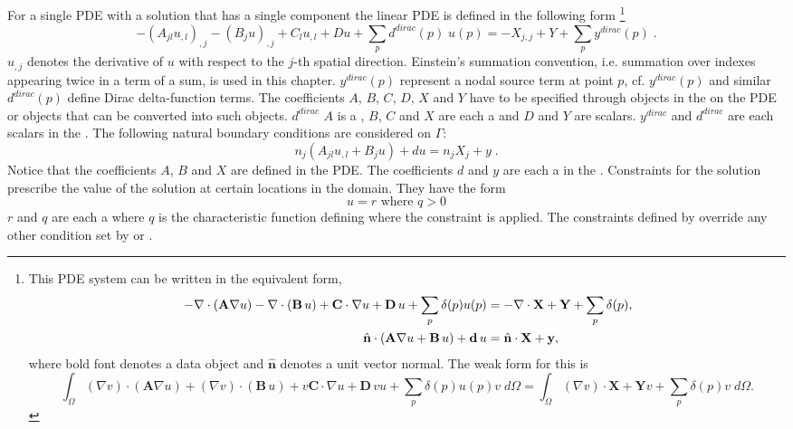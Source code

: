 For a single PDE with a solution that has a single component the linear PDE is
defined in the following form \footnote{This PDE system can be written in the equivalent form, \begin{align*} \centering \, -\nabla \cdot \left( \textbf{A} \nabla u \right) - \nabla \cdot \left( \textbf{B} \, u \right) + \textbf{C} \cdot \nabla u + \textbf{D} \, u + \sum_p \delta(p) u(p) &= - \nabla \cdot \textbf{X} + \textbf{Y} + \sum_p \delta(p), \\
	\hat{\textbf{n}} \cdot \left( \textbf{A} \nabla u + \textbf{B} \, u \right) + \textbf{d} \, u &= \hat{\textbf{n}} \cdot \textbf{X} + \textbf{y}, 
\end{align*} where bold font denotes a data object and $\hat{\textbf{n}}$ denotes a unit vector normal.  The weak form for this is
\begin{equation*}\int_{\Omega} (\nabla v)\cdot \left( \textbf{A} \nabla u \right) +( \nabla v) \cdot \left( \textbf{B} \, u \right) + v\textbf{C} \cdot \nabla u + \textbf{D} \,v u + \sum_p \delta(p) u(p)v \;d\Omega = \int_{\Omega}(\nabla v) \cdot \textbf{X} + \textbf{Y}v + \sum_p \delta(p)v\; d\Omega.
\end{equation*}
}
\begin{equation}\label{LINEARPDE.SINGLE.1}
-(A_{jl} u_{,l})_{,j}-(B_{j} u)_{,j}+C_{l} u_{,l}+D u + \sum_p d^{dirac}(p) \; u(p) =-X_{j,j}+Y + \sum_p y^{dirac}(p)  \; .
\end{equation}
$u_{,j}$ denotes the derivative of $u$ with respect to the $j$-th spatial direction.
Einstein's summation convention, i.e. summation over indexes appearing twice
in a term of a sum, is used in this chapter. $y^{dirac}(p)$ represent a nodal source term 
at point $p$, cf. $y^{dirac}(p) $ and similar $d^{dirac}(p)$ define Dirac delta-function 
terms. 
The coefficients $A$, $B$, $C$, $D$, $X$ and $Y$ have to be specified through
\Data objects in the \Function on the PDE or objects that can be converted
into such \Data objects. $d^{dirac}$
$A$ is a \RankTwo, $B$, $C$ and $X$ are each a \RankOne and $D$ and $Y$ are
scalars. $y^{dirac}$ and $d^{dirac}$ are each scalars in the \DiracDeltaFunctions. 
The following natural boundary conditions are considered on $\Gamma$: 
\begin{equation}\label{LINEARPDE.SINGLE.2}
n_{j}(A_{jl} u_{,l}+B_{j} u)+d u=n_{j}X_{j} + y  \;.
\end{equation}
Notice that the coefficients $A$, $B$ and $X$ are defined in the PDE.
The coefficients $d$ and $y$ are each a \Scalar in the \FunctionOnBoundary.
Constraints for the solution prescribe the value of the
solution at certain locations in the domain. They have the form
\begin{equation}\label{LINEARPDE.SINGLE.3}
u=r \mbox{ where } q>0
\end{equation}
$r$ and $q$ are each a \Scalar where $q$ is the characteristic function
defining where the constraint is applied.
The constraints defined by  override any other
condition set by  or .

